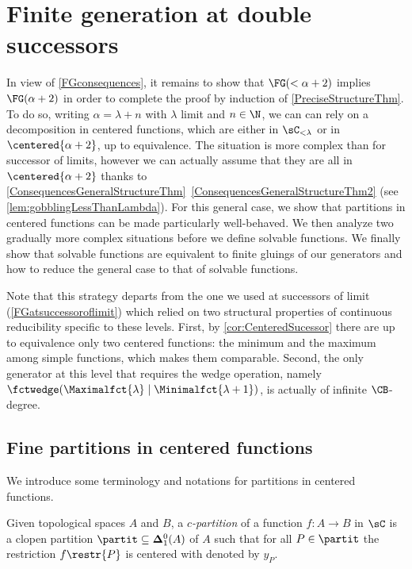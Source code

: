 
\chapter{Finite generation at double successors}\label{sectionDoubleSucc}

In view of \cref{FGconsequences}, it remains to show that $\FG(<\alpha+2)$ implies $\FG(\alpha+2)$ in order to complete the proof by induction of \cref{PreciseStructureThm}.
To do so, writing $\alpha=\lambda+n$ with $\lambda$ limit and $n\in\N$, we can can rely on a decomposition in centered functions, which are either in $\sC_{<\lambda}$ or in $\centered{\alpha+2}$, up to equivalence.
The situation is more complex than for successor of limits, however we can actually assume that they are all in $\centered{\alpha+2}$ thanks to \cref{ConsequencesGeneralStructureThm}~\cref{ConsequencesGeneralStructureThm2} (see \cref{lem:gobblingLessThanLambda}).
For this general case, we show that partitions in centered functions can be made particularly well-behaved. We then analyze two gradually more complex situations before we define solvable functions. We finally show that solvable functions are equivalent to finite gluings of our generators and how to reduce the general case to that of solvable functions.


Note that this strategy departs from the one we used at successors of limit (\cref{FGatsuccessoroflimit}) which relied on two structural properties of continuous reducibility specific to these levels. %
First, by \cref{cor:CenteredSucessor} there are up to equivalence only two centered functions: the minimum and the maximum among simple functions, which makes them comparable.
Second, the only generator at this level that requires the wedge operation,
namely $\fctwedge(\Maximalfct{\lambda}\mid\Minimalfct{\lambda+1})$, is actually of infinite $\CB$-degree.

 

\section{Fine partitions in centered functions}\label{DoubleSucc_domain}

We introduce some terminology and notations for partitions in centered functions.

Given topological spaces $A$ and $B$, a \emph{$c$-partition} of a function $f:A\to B$ in $\sC$ is a clopen partition $\partit\subseteq \mathbf{\Delta}^0_1(A)$ of $A$
such that for all $P\in \partit$ the restriction $f\restr{P}$ is centered with \cocenter{} denoted by $y_P$.

